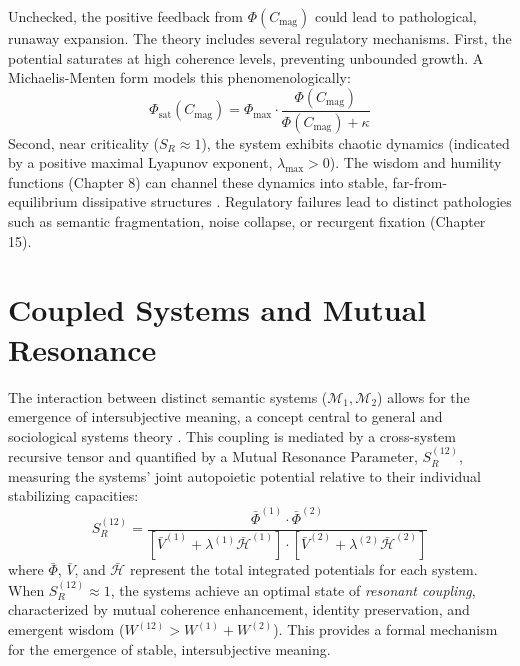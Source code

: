 Unchecked, the positive feedback from \(\Phi(C_{\mathrm{mag}})\) could lead to pathological, runaway expansion. The theory includes several regulatory mechanisms. First, the potential saturates at high coherence levels, preventing unbounded growth. A Michaelis-Menten form \autocite{MichaelisMenten1913} models this phenomenologically:
\begin{equation}
\Phi_{\text{sat}}(C_{\mathrm{mag}}) = \Phi_{\text{max}} \cdot \frac{\Phi(C_{\mathrm{mag}})}{\Phi(C_{\mathrm{mag}}) + \kappa}
\end{equation}
Second, near criticality (\(S_R \approx 1\)), the system exhibits chaotic dynamics (indicated by a positive maximal Lyapunov exponent, \(\lambda_{\text{max}} > 0\)). The wisdom and humility functions (Chapter 8) can channel these dynamics into stable, far-from-equilibrium dissipative structures \autocite{PrigogineStengers1984}. Regulatory failures lead to distinct pathologies such as semantic fragmentation, noise collapse, or recurgent fixation (Chapter 15).

\section{Coupled Systems and Mutual Resonance}

The interaction between distinct semantic systems (\(\mathcal{M}_1, \mathcal{M}_2\)) allows for the emergence of intersubjective meaning, a concept central to general and sociological systems theory \autocite{vonBertalanffy1968, Luhmann1995}. This coupling is mediated by a cross-system recursive tensor and quantified by a Mutual Resonance Parameter, \(S_R^{(12)}\), measuring the systems' joint autopoietic potential relative to their individual stabilizing capacities:
\begin{equation}
S_R^{(12)} = \frac{\bar{\Phi}^{(1)} \cdot \bar{\Phi}^{(2)}}{[\bar{V}^{(1)} + \lambda^{(1)} \bar{\mathcal{H}}^{(1)}] \cdot [\bar{V}^{(2)} + \lambda^{(2)} \bar{\mathcal{H}}^{(2)}]}
\end{equation}
where \(\bar{\Phi}\), \(\bar{V}\), and \(\bar{\mathcal{H}}\) represent the total integrated potentials for each system. When \(S_R^{(12)} \approx 1\), the systems achieve an optimal state of \textit{resonant coupling}, characterized by mutual coherence enhancement, identity preservation, and emergent wisdom (\(W^{(12)} > W^{(1)} + W^{(2)}\)). This provides a formal mechanism for the emergence of stable, intersubjective meaning.